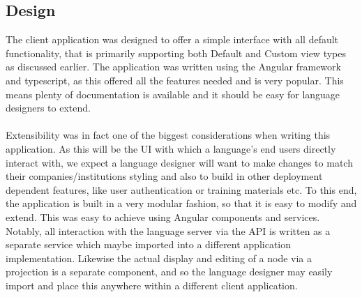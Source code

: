 \documentclass{article}
\begin{document}
\subsection{Design}
The client application was designed to offer a simple interface with all default functionality, that is primarily  supporting both Default and Custom view types as discussed earlier. The application was written using the Angular framework and typescript, as this offered all the features needed and is very popular. This means plenty of documentation is available and it should be easy for language designers to extend.
\\
\\
Extensibility was in fact one of the biggest considerations when writing this application. As this will be the UI with which a language's end users directly interact with, we expect a language designer will want to make changes to match their companies/institutions styling and also to build in other  deployment dependent features, like user authentication or training materials etc. To this end, the application is built in a very modular fashion, so that it is easy to modify and extend. This was easy to achieve using Angular components and services. Notably, all interaction with the language server via the API is written as a separate service which maybe imported into a different application implementation. Likewise the actual display and editing of a node via a projection is a separate component, and so the language designer may easily import and place this anywhere within a different client application.
\end{document}
